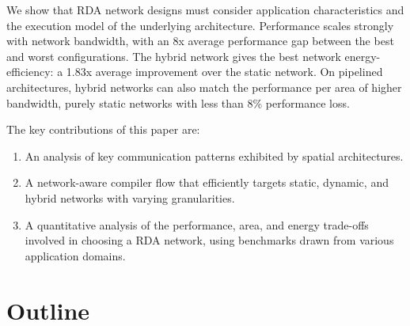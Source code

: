 We show that RDA network designs must consider application characteristics and the execution model of the underlying architecture.
Performance scales strongly with network bandwidth, with an 8x average performance gap between the best and worst configurations. 
The hybrid network gives the best network energy-efficiency: a 1.83x average improvement over the static network. On pipelined architectures,
hybrid networks can also match the performance per area of higher bandwidth, purely static networks with less than 8\% performance loss.

The key contributions of this paper are:
\begin{enumerate}
    \item An analysis of key communication patterns exhibited by spatial architectures.
    \item A network-aware compiler flow that efficiently targets static, dynamic, and hybrid
      networks with varying granularities.
    \item A quantitative analysis of the performance, area, and energy trade-offs involved in choosing a RDA network, using benchmarks drawn from various application domains.
\end{enumerate}

\section{Outline}
